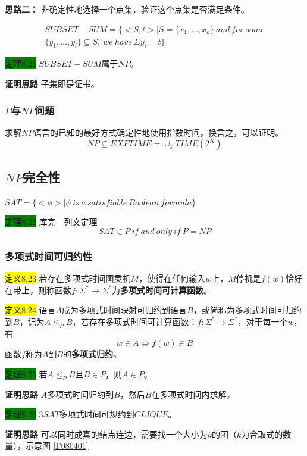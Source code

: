 \documentclass[a4paper]{article}
\begin{document}
		\qquad \textbf{思路二：} 非确定性地选择一个点集，验证这个点集是否满足条件。

	\begin{multline}
		SUBSET-SUM=\{<S,t>|S=\{x_1,\dots,x_k\}~and~for~some \\
							\{y_1,\dots,y_l\}\subseteq S,~we~have~\Sigma{y_i}=t\}
	\end{multline}
	
	\colorbox{green}{定理8.21} $SUBSET-SUM$属于$NP$。

	\textbf{证明思路} 子集即是证书。

\subsubsection{$P$与$NP$问题}

	求解$NP$语言的已知的最好方式确定性地使用指数时间。换言之，可以证明。
	$$NP \subseteq EXPTIME=\cup_k TIME(2^K)$$

\subsection{$NP$完全性}

	$SAT=\{<\phi>|\phi~is~a~satisfiable~Boolean~formula\}$

	\colorbox{green}{定理8.22} 库克—列文定理
	$$SAT \in P~if~and~only~if~P=NP$$

\subsubsection{多项式时间可归约性}

	\colorbox{yellow}{定义8.23} 若存在多项式时间图灵机$M$，使得在任何输入$w$上，$M$停机是$f(w)$恰好在带上，则称函数$f:\Sigma^* \rightarrow \Sigma^*$为\textbf{多项式时间可计算函数}。
	
	\colorbox{yellow}{定义8.24} 语言$A$成为多项式时间映射可归约到语言$B$，或简称为多项式时间可归约到$B$，记为$A\leq_P B$，若存在多项式时间可计算函数：$f:\Sigma^* \rightarrow \Sigma^*$，对于每一个$w$，有
	$$w \in A \Leftrightarrow f(w) \in B$$
函数$f$称为$A$到$B$的\textbf{多项式归约}。

	\colorbox{green}{定理8.25} 若$A \leq_P B$且$B \in P$，则$A \in P$。
	
	\textbf{证明思路} \quad $A$多项式时间归约到$B$，然后$B$在多项式时间内求解。
	
	\colorbox{green}{定理8.26} $3SAT$多项式时间可规约到$CLIQUE$。
	
	\textbf{证明思路} \quad 可以同时成真的结点连边，需要找一个大小为$k$的团（$k$为合取式的数量），示意图 \ref{F080401}
\end{document}
